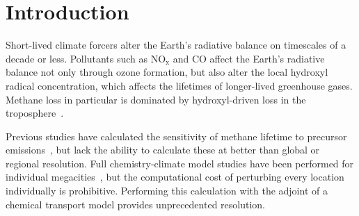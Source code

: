 \section{Introduction}

Short-lived climate forcers alter the Earth's radiative balance on timescales of a decade or less. Pollutants such as $\mathrm{NO_x}$ and $\mathrm{CO}$ affect the Earth's radiative balance not only through ozone formation, but also alter the local hydroxyl radical concentration, which affects the lifetimes of longer-lived greenhouse gases. Methane loss in particular is dominated by hydroxyl-driven loss in the troposphere~\citep{ref:kirschke2013}.

Previous studies have calculated the sensitivity of methane lifetime to precursor emissions~\citep{ref:holmes2013}, but lack the ability to calculate these at better than global or regional resolution. Full chemistry-climate model studies have been performed for individual megacities~\citep{ref:dang2015}, but the computational cost of perturbing every location individually is prohibitive. Performing this calculation with the adjoint of a chemical transport model provides unprecedented resolution.